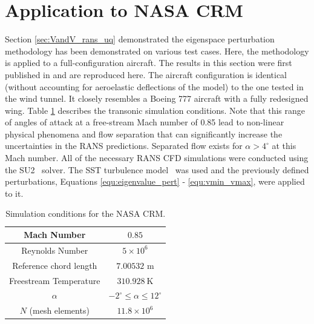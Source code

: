 \section{Application to NASA CRM} \label{sec:crm_rans_uq}
Section \ref{sec:VandV_rans_uq} demonstrated the eigenspace perturbation methodology has been demonstrated on various test cases.
Here, the methodology is applied to a full-configuration aircraft.
The results in this section were first published in \cite{mukhopadhaya2020multi}  and are reproduced here.
The aircraft configuration is identical (without accounting for aeroelastic deflections of the model) to the one tested in the wind tunnel.
It closely resembles a Boeing 777 aircraft with a fully redesigned wing.
Table \ref{NASA_CRM_test_cond} describes the transonic simulation conditions.
Note that this range of angles of attack at a free-stream Mach number of 0.85 lead to non-linear physical phenomena and flow separation that can significantly increase the uncertainties in the RANS predictions.
Separated flow exists for $\alpha > 4^\circ$ at this Mach number.
All of the necessary RANS CFD simulations were conducted using the SU2~\cite{su2_aiaajournal} solver.
The SST turbulence model~\cite{sst,menter2003ten} was used and the previously defined perturbations, Equations \eqref{equ:eigenvalue_pert} - \eqref{equ:vmin_vmax}, were applied to it. 
 
\begin{table}
\centering
    \renewcommand{\arraystretch}{1.2}
    \captionsetup{justification=centering}
    \caption{Simulation conditions for the NASA CRM.} 
    \begin{tabular}{|c|c|}
        \hline
        Mach Number & $0.85$ \\ \hline
        Reynolds Number & $5\times10^6$ \\ \hline
        Reference chord length & $7.00532$ m \\ \hline
        Freestream Temperature & $310.928~\text{K}$ \\ \hline
        $\alpha$ & $-2^\circ \leq \alpha \leq 12^\circ$ \\ \hline 
        $N$ (mesh elements) &  $11.8\times10^6$ \\ \hline
    \end{tabular}
    \label{NASA_CRM_test_cond}
\end{table}

